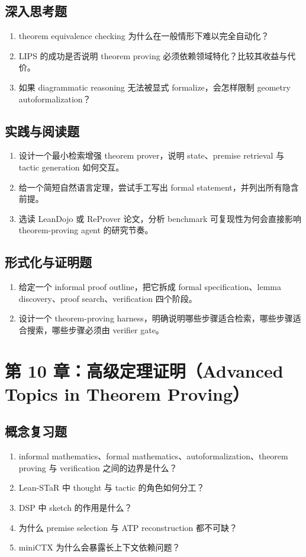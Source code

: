 \subsection*{深入思考题}
\begin{enumerate}
\item theorem equivalence checking 为什么在一般情形下难以完全自动化？
\item LIPS 的成功是否说明 theorem proving 必须依赖领域特化？比较其收益与代价。
\item 如果 diagrammatic reasoning 无法被显式 formalize，会怎样限制 geometry autoformalization？
\end{enumerate}

\subsection*{实践与阅读题}
\begin{enumerate}
\item 设计一个最小检索增强 theorem prover，说明 state、premise retrieval 与 tactic generation 如何交互。
\item 给一个简短自然语言定理，尝试手工写出 formal statement，并列出所有隐含前提。
\item 选读 LeanDojo 或 ReProver 论文，分析 benchmark 可复现性为何会直接影响 theorem-proving agent 的研究节奏。
\end{enumerate}

\subsection*{形式化与证明题}
\begin{enumerate}
\item 给定一个 informal proof outline，把它拆成 formal specification、lemma discovery、proof search、verification 四个阶段。
\item 设计一个 theorem-proving harness，明确说明哪些步骤适合检索，哪些步骤适合搜索，哪些步骤必须由 verifier gate。
\end{enumerate}

\section{第 10 章：高级定理证明（Advanced Topics in Theorem Proving）}

\subsection*{概念复习题}
\begin{enumerate}
\item informal mathematics、formal mathematics、autoformalization、theorem proving 与 verification 之间的边界是什么？
\item Lean-STaR 中 thought 与 tactic 的角色如何分工？
\item DSP 中 sketch 的作用是什么？
\item 为什么 premise selection 与 ATP reconstruction 都不可缺？
\item miniCTX 为什么会暴露长上下文依赖问题？
\end{enumerate}


